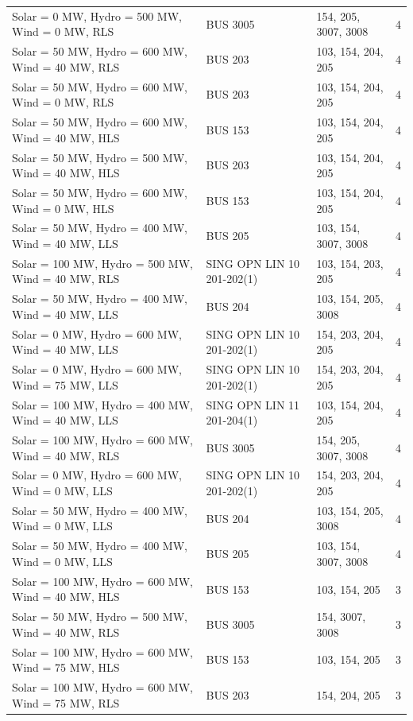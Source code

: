 \documentclass[10pt]{report}
\begin{document}
\begin{table}[H]
{\begin{tabular}{llp{8cm}r}
Solar = 0 MW, Hydro = 500 MW, Wind = 0 MW, RLS & BUS 3005 & 154, 205, 3007, 3008 & 4 \\
Solar = 50 MW, Hydro = 600 MW, Wind = 40 MW, RLS & BUS 203 & 103, 154, 204, 205 & 4 \\
Solar = 50 MW, Hydro = 600 MW, Wind = 0 MW, RLS & BUS 203 & 103, 154, 204, 205 & 4 \\
Solar = 50 MW, Hydro = 600 MW, Wind = 40 MW, HLS & BUS 153 & 103, 154, 204, 205 & 4 \\
Solar = 50 MW, Hydro = 500 MW, Wind = 40 MW, HLS & BUS 203 & 103, 154, 204, 205 & 4 \\
Solar = 50 MW, Hydro = 600 MW, Wind = 0 MW, HLS & BUS 153 & 103, 154, 204, 205 & 4 \\
Solar = 50 MW, Hydro = 400 MW, Wind = 40 MW, LLS & BUS 205 & 103, 154, 3007, 3008 & 4 \\
Solar = 100 MW, Hydro = 500 MW, Wind = 40 MW, RLS & SING OPN LIN   10 201-202(1) & 103, 154, 203, 205 & 4 \\
Solar = 50 MW, Hydro = 400 MW, Wind = 40 MW, LLS & BUS 204 & 103, 154, 205, 3008 & 4 \\
Solar = 0 MW, Hydro = 600 MW, Wind = 40 MW, LLS & SING OPN LIN   10 201-202(1) & 154, 203, 204, 205 & 4 \\
Solar = 0 MW, Hydro = 600 MW, Wind = 75 MW, LLS & SING OPN LIN   10 201-202(1) & 154, 203, 204, 205 & 4 \\
Solar = 100 MW, Hydro = 400 MW, Wind = 40 MW, LLS & SING OPN LIN   11 201-204(1) & 103, 154, 204, 205 & 4 \\
Solar = 100 MW, Hydro = 600 MW, Wind = 40 MW, RLS & BUS 3005 & 154, 205, 3007, 3008 & 4 \\
Solar = 0 MW, Hydro = 600 MW, Wind = 0 MW, LLS & SING OPN LIN   10 201-202(1) & 154, 203, 204, 205 & 4 \\
Solar = 50 MW, Hydro = 400 MW, Wind = 0 MW, LLS & BUS 204 & 103, 154, 205, 3008 & 4 \\
Solar = 50 MW, Hydro = 400 MW, Wind = 0 MW, LLS & BUS 205 & 103, 154, 3007, 3008 & 4 \\
Solar = 100 MW, Hydro = 600 MW, Wind = 40 MW, HLS & BUS 153 & 103, 154, 205 & 3 \\
Solar = 50 MW, Hydro = 500 MW, Wind = 40 MW, RLS & BUS 3005 & 154, 3007, 3008 & 3 \\
Solar = 100 MW, Hydro = 600 MW, Wind = 75 MW, HLS & BUS 153 & 103, 154, 205 & 3 \\
Solar = 100 MW, Hydro = 600 MW, Wind = 75 MW, RLS & BUS 203 & 154, 204, 205 & 3 \\

\end{tabular}}
\end{table}
\end{document}
